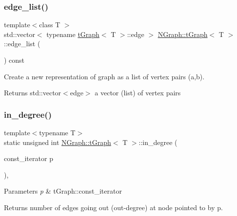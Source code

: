 \subsubsection{\texorpdfstring{edge\+\_\+list()}{edge\_list()}}
{\footnotesize\ttfamily template$<$class T $>$ \\
std\+::vector$<$ typename \mbox{\hyperlink{class_n_graph_1_1t_graph}{t\+Graph}}$<$ T $>$\+::edge $>$ \mbox{\hyperlink{class_n_graph_1_1t_graph}{N\+Graph\+::t\+Graph}}$<$ T $>$\+::edge\+\_\+list (\begin{DoxyParamCaption}{ }\end{DoxyParamCaption}) const}

Create a new representation of graph as a list of vertex pairs (a,b).

\begin{DoxyReturn}{Returns}
std\+::vector$<$edge$>$ a vector (list) of vertex pairs 
\end{DoxyReturn}
\mbox{\label{class_n_graph_1_1t_graph_a5c269fb5cb63c82496bb9c59d6c289b1}} 
\subsubsection{\texorpdfstring{in\+\_\+degree()}{in\_degree()}}
{\footnotesize\ttfamily template$<$typename T$>$ \\
static unsigned int \mbox{\hyperlink{class_n_graph_1_1t_graph}{N\+Graph\+::t\+Graph}}$<$ T $>$\+::in\+\_\+degree (\begin{DoxyParamCaption}\item[{const\+\_\+iterator}]{p }\end{DoxyParamCaption})\hspace{0.3cm}{\ttfamily [inline]}, {\ttfamily [static]}}


\begin{DoxyParams}{Parameters}
{\em p} & t\+Graph\+::const\+\_\+iterator \\
\hline
\end{DoxyParams}
\begin{DoxyReturn}{Returns}
number of edges going out (out-\/degree) at node pointed to by p. 
\end{DoxyReturn}
\mbox{\label{class_n_graph_1_1t_graph_a463b923ee1e3604407837150f17f1a74}} 
